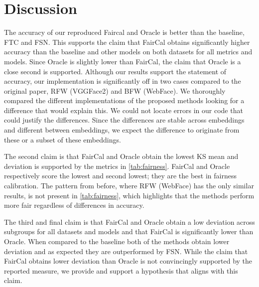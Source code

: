 \section{Discussion}
The accuracy of our reproduced Faircal and Oracle is better than the baseline, FTC and FSN. This supports the claim that FairCal obtains significantly higher accuracy than the baseline and other models on both datasets for all metrics and models. Since Oracle is slightly lower than FairCal, the claim that Oracle is a close second is supported.
Although our results support the statement of accuracy, our implementation is significantly off in two cases compared to the original paper, RFW (VGGFace2) and BFW (WebFace). We thoroughly compared the different implementations of the proposed methods looking for a difference that would explain this. We could not locate errors in our code that could justify the differences. Since the differences are stable across embeddings and different between embeddings, we expect the difference to originate from these or a subset of these embeddings. 

The second claim is that FairCal and Oracle obtain the lowest KS mean and deviation is supported by the metrics in \autoref{tab:fairness}.
FairCal and Oracle respectively score the lowest and second lowest; they are the best in fairness calibration. 
The pattern from before, where RFW (WebFace) has the only similar results, is not present in \autoref{tab:fairness}, which highlights that the methods perform more fair regardless of differences in accuracy.

The third and final claim is that FairCal and Oracle obtain a low deviation across subgroups for all datasets
and models and that FairCal is significantly lower than Oracle.
When compared to the baseline both of the methods obtain lower deviation and as expected they are outperformed by FSN.
While the claim that FairCal obtains lower deviation than Oracle is not convincingly supported by the reported measure, we provide and support a hypothesis that aligns with this claim.


